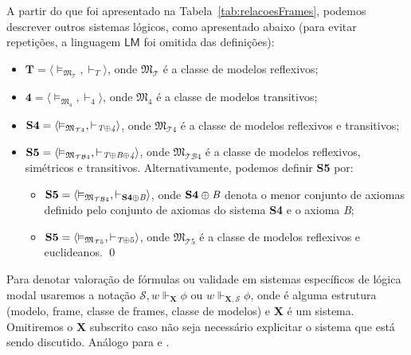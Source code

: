         \begin{exemplo}
            \label{exe:SistemasModal}
            A partir do que foi apresentado na Tabela~\ref{tab:relacoesFrames}, podemos descrever outros sistemas lógicos, como apresentado abaixo
            (para evitar repetições, a linguagem \(\mathsf{LM}\) foi omitida das definições):

            \begin{itemize}
                \item \(\mathbf{T} = \langle \vDash_{\mathfrak{M}_{\mathcal{T}}}, \vdash_{\textit{T}} \rangle\), onde \(\mathfrak{M}_{\mathcal{T}}\) é a classe de
                modelos reflexivos;

                \item \(\mathbf{4} = \langle \vDash_{\mathfrak{M}_4}, \vdash_{\textit{4}} \rangle\), onde \(\mathfrak{M}_4\) é a classe de
                modelos transitivos;

                \item \(\mathbf{S4} = \langle \vDash_{\mathfrak{M}_{\mathcal{T}4}}, \vdash_{\textit{T}\mathbin{\oplus}\textit{4}} \rangle\), onde \(\mathfrak{M}_{\mathcal{T}4}\)
                é a classe de modelos reflexivos e transitivos;

                \item \(\mathbf{S5} = \langle \vDash_{\mathfrak{M}_{\mathcal{TB}4}}, \vdash_{\textit{T}\mathbin{\oplus}\textit{B}\mathbin{\oplus}\textit{4}} \rangle\),
                onde \(\mathfrak{M}_{\mathcal{TB}4}\) é a classe de modelos reflexivos, simétricos e transitivos. Alternativamente, podemos definir \textbf{S5} por:
                \begin{itemize}
                    \item \(\mathbf{S5} = \langle \vDash_{\mathfrak{M}_{\mathcal{TB}4}}, \vdash_{\mathbf{S4}\mathbin{\oplus}\textit{B}} \rangle\), onde
                    \(\mathbf{S4}\mathbin{\oplus}\textit{B}\) denota o menor conjunto de axiomas definido pelo conjunto de axiomas do sistema \textbf{S4} e o axioma \textit{B};

                    \item \(\mathbf{S5} = \langle \vDash_{\mathfrak{M}_{\mathcal{T}5}}, \vdash_{\textit{T}\mathbin{\oplus} 5} \rangle\), onde \(\mathfrak{M}_{\mathcal{T}5}\)
                    é a classe de modelos reflexivos e euclideanos. \qed
                \end{itemize}
            \end{itemize}
        \end{exemplo}
        Para denotar valoração de fórmulas ou validade em sistemas específicos de lógica modal usaremos a notação \(\mathcal{S}, w \Vdash_{\mathbf{X}} \phi\) ou
        \(w \Vdash_{\mathbf{X}, \mathcal{S}} \phi\), onde  é alguma estrutura (modelo, frame, classe de frames, classe de modelos)
        e \textbf{X} é um sistema. Omitiremos o \textbf{X} subscrito caso não seja necessário
        explicitar o sistema que está sendo discutido. Análogo para \VDDASH e \VDASH.

